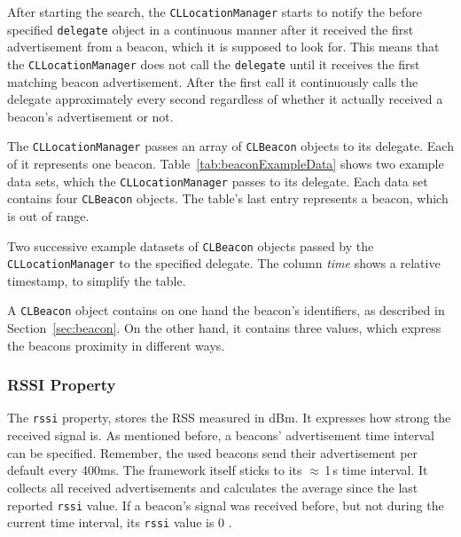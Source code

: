After starting the search, the \texttt{CLLocationManager} starts to notify the before specified \texttt{delegate} object in a continuous manner after it received the first advertisement from a beacon, which it is supposed to look for. This means that the \texttt{CLLocationManager} does not call the \texttt{delegate} until it receives the first matching beacon advertisement. After the first call it continuously calls the delegate approximately every second regardless of whether it actually received a beacon's advertisement or not.

The \texttt{CLLocationManager} passes an array of \texttt{CLBeacon} objects to its delegate. Each of it represents one beacon. Table~\ref{tab:beaconExampleData} shows two example data sets, which the \texttt{CLLocation\-Manager} passes to its delegate. Each data set contains four \texttt{CLBeacon} objects. The table's last entry represents a beacon, which is out of range.

\begin{table}
	
	\caption{Two successive example datasets of \texttt{CLBeacon} objects passed by the \texttt{CLLocationManager} to the specified delegate. The column \emph{time} shows a relative timestamp, to simplify the table.}
	\label{tab:beaconExampleData}
\end{table}

A \texttt{CLBeacon} object contains on one hand the beacon's identifiers, as described in Section~\ref{sec:beacon}. On the other hand, it contains three values, which express the beacons proximity in different ways.

\subsubsection*{\acs{RSSI} Property}
The \texttt{rssi} property, stores the \acl{RSS} measured in dBm. It expresses how strong the received signal is. As mentioned before, a beacons' advertisement time interval can be specified. Remember, the used beacons send their advertisement per default every 400ms. The framework itself sticks to its $\approx$\,1\,s time interval. It collects all received advertisements and calculates the average since the last reported \texttt{rssi} value. If a beacon's signal was received before, but not during the current time interval, its \texttt{rssi} value is 0 \citep{apple:wwdc_2013_bruins,apple:ios_doc_cl}.

